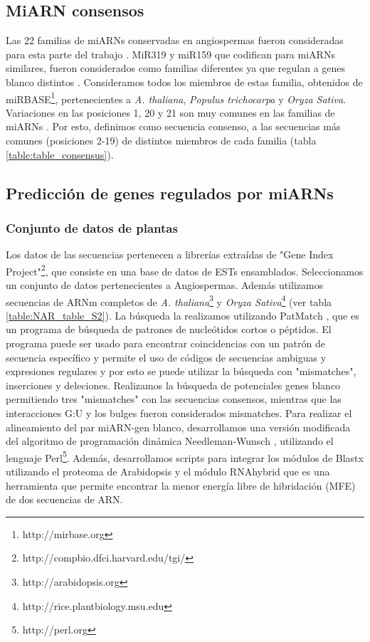 \subsection{MiARN consensos}
Las 22 familias de miARNs conservadas en angiospermas fueron consideradas para esta parte del trabajo \citep{Fahlgren2010,Axtell2008343}.
MiR319 y miR159 que codifican para miARNs similares, fueron considerados como familias diferentes ya que regulan a genes blanco distintos \citep{Palatnik2007}.
Consideramos todos los miembros de estas familia, obtenidos de miRBASE\footnote{http://mirbase.org}, pertenecientes a \textit{A. thaliana}, \textit{Populus trichocarpa} y \textit{Oryza Sativa}.
Variaciones en las posiciones 1, 20 y 21 son muy comunes en las familias de miARNs \citep{10.1371/journal.pgen.1002419}. 
Por esto, definimos como secuencia consenso, a las secuencias más comunes (posiciones 2-19) de distintos miembros de cada familia (tabla \ref{table:table_consensus}).

\subsection{Predicción de genes regulados por miARNs}

\subsubsection{Conjunto de datos de plantas}
Los datos de las secuencias pertenecen a librerías extraídas de "Gene Index Project"\footnote{http://compbio.dfci.harvard.edu/tgi/}, que consiste en una base de datos de ESTs ensamblados.
Seleccionamos un conjunto de datos pertenecientes a Angiospermas.
Además utilizamos secuencias de ARNm completos de \textit{A. thaliana}\footnote{http://arabidopsis.org} y \textit{Oryza Sativa}\footnote{http://rice.plantbiology.msu.edu} (ver tabla \ref{table:NAR_table_S2}).
La búsqueda la realizamos utilizando PatMatch \citep{Yan01072005}, que es un programa de búsqueda de patrones de nucleótidos cortos o péptidos.
El programa puede ser usado para encontrar coincidencias con un patrón de secuencia específico y permite el uso de códigos de secuencias ambiguas y expresiones regulares y por esto se puede utilizar la búsqueda con "mismatches", inserciones y deleciones.
Realizamos la búsqueda de potenciales genes blanco permitiendo tres "mismatches" con las secuencias consensos, mientras que las interacciones G:U y los bulges fueron considerados mismatches.
Para realizar el alineamiento del par miARN-gen blanco, desarrollamos una versión modificada del algoritmo de programación dinámica Needleman-Wunsch \citep{Needleman1970443}, utilizando el lenguaje Perl\footnote{http://perl.org}.
Además, desarrollamos scripts para integrar los módulos de Blastx \citep{Altschup1990} utilizando el proteoma de Arabidopsis y el módulo RNAhybrid \citep{Giegerich2004} que es una herramienta que permite encontrar la menor energía libre de hibridación (MFE) de dos secuencias de ARN.

